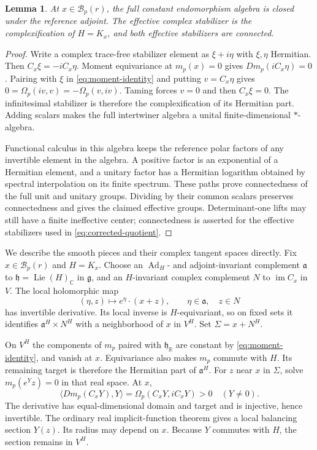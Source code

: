 \documentclass[11pt]{amsart}
\newtheorem{lemma}[theorem]{Lemma}
\theoremstyle{definition}
\theoremstyle{remark}
\newcommand{\CC}{\mathbb C}
\newcommand{\RR}{\mathbb R}
\newcommand{\cB}{\mathcal B}
\newcommand{\im}{\operatorname{im}}
\newcommand{\Lie}{\operatorname{Lie}}
\begin{document}
\begin{lemma}\label{lem:stabilizer}
At $x\in\cB_p(r)$, the full constant endomorphism algebra is closed
under the reference adjoint. The effective complex stabilizer is the
complexification of $H=K_x$, and both effective stabilizers are connected.
\end{lemma}
\begin{proof}
Write a complex trace-free stabilizer element as $\xi+i\eta$ with
$\xi,\eta$ Hermitian. Then $C_x\xi=-iC_x\eta$.
Moment equivariance at $m_p(x)=0$ gives $Dm_p(iC_x\eta)=0$.
Pairing with $\xi$ in \eqref{eq:moment-identity} and putting
$v=C_x\eta$ gives
$0=\Omega_p(iv,v)=-\Omega_p(v,iv)$. Taming forces $v=0$ and
then $C_x\xi=0$. The infinitesimal stabilizer is therefore the
complexification of its Hermitian part. Adding scalars makes the
full intertwiner algebra a unital finite-dimensional $*$-algebra.

Functional calculus in this algebra keeps the reference polar factors
of any invertible element in the algebra. A positive factor is an
exponential of a Hermitian element, and a unitary factor has a
Hermitian logarithm obtained by spectral interpolation on its finite
spectrum. These paths prove connectedness of the full unit and unitary
groups. Dividing by their common scalars preserves connectedness and
gives the claimed effective groups. Determinant-one lifts may still
have a finite ineffective center; connectedness is asserted for the
effective stabilizers used in \eqref{eq:corrected-quotient}.
\end{proof}

We describe the smooth pieces and their complex tangent spaces directly.
Fix $x\in\cB_p(r)$ and $H=K_x$. Choose an $\operatorname{Ad}_H$-
and adjoint-invariant complement $\mathfrak a$ to
$\mathfrak h=\Lie(H)_{\CC}$ in $\mathfrak g$, and an $H$-invariant
complex complement $N$ to $\im C_x$ in $V$. The local holomorphic map
\begin{equation}\label{eq:local-product}
 (\eta,z)\longmapsto e^\eta\cdot(x+z),
 \qquad \eta\in\mathfrak a,\quad z\in N
\end{equation}
has invertible derivative. Its local inverse is $H$-equivariant, so
on fixed sets it identifies $\mathfrak a^H\times N^H$ with a
neighborhood of $x$ in $V^H$. Set $\Sigma=x+N^H$.

On $V^H$ the components of $m_p$ paired with $\mathfrak h_{\RR}$
are constant by \eqref{eq:moment-identity}, and vanish at $x$.
Equivariance also makes $m_p$ commute with $H$. Its remaining target
is therefore the Hermitian part of $\mathfrak a^H$. For $z$ near
$x$ in $\Sigma$, solve $m_p(e^Yz)=0$ in that real space. At $x$,
\[
 \langle Dm_p(C_xY),Y\rangle
       =\Omega_p(C_xY,iC_xY)>0\quad(Y\ne0).
\]
The derivative has equal-dimensional domain and target and is injective,
hence invertible. The ordinary real implicit-function theorem gives
a local balancing section $Y(z)$. Its radius may depend on $x$.
Because $Y$ commutes with $H$, the section remains in $V^H$.
\end{document}
